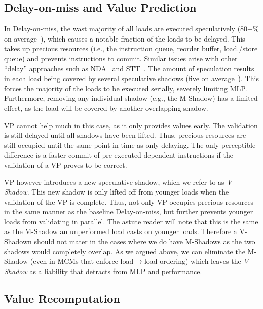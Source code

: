 \subsection{Delay-on-miss and Value Prediction} 

In Delay-on-miss, the wast majority of all loads are executed speculatively (80+\% on average~\cite{}), which causes a notable fraction of the loads to be delayed. This takes up precious resources (i.e., the instruction queue, reorder buffer, load./store queue) and prevents instructions to commit. Similar issues arise with other ``delay'' approaches such as NDA~\cite{} and STT~\cite{}.
The amount of speculation results in each load being covered by several speculative shadows (five on average~\cite{}). This forces the majority of the loads to be executed serially, severely limiting MLP. Furthermore, removing any individual shadow (e.g., the M-Shadow) has a limited effect, as the load will be covered by another overlapping shadow.

VP cannot help much in this case, as it only provides values early. The validation is still delayed until all shadows have been lifted. Thus, precious resources are still occupied until the same point in time as only delaying.
The only perceptible difference is a faster commit of pre-executed dependent instructions if the validation of a VP proves to be correct.

VP however introduces a new speculative shadow, which we refer to as \emph{V-Shadow}. This new shadow is only lifted off from younger loads when the validation of the VP is complete. Thus, not only VP occupies precious resources in the same manner as the baseline Delay-on-miss, but further prevents younger loads from validating in parallel. The astute reader will note that this is the same as the M-Shadow an unperformed load casts on younger loads. Therefore a V-Shadown should not mater in the cases where we do have M-Shadows as the two shadows would completely overlap. As we argued above, we can eliminate the M-Shadow (even in MCMs that enforce load$\rightarrow$load ordering) which leaves the \emph{V-Shadow} as a liability that detracts from MLP and performance.

\subsection{Value Recomputation}
\label{sec:recmp}


